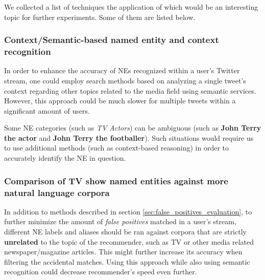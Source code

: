 We collected a list of techniques the application of which would be an
interesting topic for further experiments. Some of them are listed below.

\subsubsection{Context/Semantic-based named entity and context recognition}

In order to enhance the accuracy of NEs recognized within a user's Twitter
stream, one could employ search methods based on analyzing a single tweet's
context regarding other topics related to the media field using semantic
services.  However, this approach could be much slower for multiple tweets
within a significant amount of users.

Some NE categories (such as \textit{TV Actors}) can be ambiguous
(such as \textbf{John Terry the actor} and \textbf{John Terry the footballer}).
Such situations would require us to use additional methods (such as context-based
reasoning) in order to accurately identify the NE in question.

\subsubsection{Comparison of TV show named entities against more natural language corpora}

In addition to methods described in section \ref{sec:false_positives_evaluation}, to further minimize the
amount of \textit{false positives}
matched in a user's stream, different NE labels and aliases should be ran against corpora
that are strictly \textbf{unrelated} to the topic of the recommender, such as TV or other media related
newspaper/magazine articles. This might further increase its accuracy when filtering the accidental
matches. Using this approach while also using semantic recognition could decrease recommender's
speed even further.
